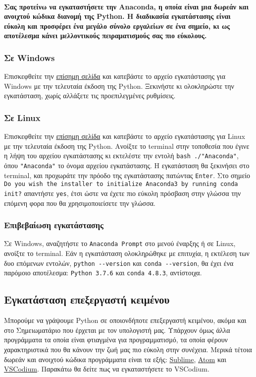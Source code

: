 \documentclass[a4paper,10pt]{report}
\begin{document}
\paragraph{
    Σας προτείνω να εγκαταστήσετε την Anaconda, η οποία είναι μια δωρεάν
    και ανοιχτού κώδικα διανομή της Python. Η διαδικασία εγκατάστασης είναι
    εύκολη και προσφέρει ένα μεγάλο σύνολο εργαλείων σε ένα σημείο, κι ως
    αποτέλεσμα κάνει μελλοντικούς πειραματισμούς σας πιο εύκολους.
}
\subsubsection{Σε Windows}
Επισκεφθείτε την \href{https://tinyurl.com/yc39u67t}{επίσημη σελίδα}
και κατεβάστε το αρχείο εγκατάστασης για Windows με την τελευταία έκδοση της
Python. Ξεκινήστε κι ολοκληρώστε την εγκατάσταση, χωρίς αλλάξετε τις
προεπιλεγμένες ρυθμίσεις.
\subsubsection{Σε Linux}
Επισκεφθείτε την \href{https://tinyurl.com/yc39u67t}{επίσημη σελίδα}
και κατεβάστε το αρχείο εγκατάστασης για Linux με την τελευταία έκδοση της
Python. Ανοίξτε το terminal στην τοποθεσία που έγινε η λήψη του αρχείου
εγκατάστασης κι εκτελέστε την εντολή
\lstinline{bash ./"Anaconda"}, όπου
\lstinline{"Anaconda"} το όνομα αρχείου εγκατάστασης.
Η εγκατάσταση θα ξεκινήσει στο terminal, και προχωράτε την πρόοδο της
εγκατάστασης πατώντας \lstinline{Enter}. Στο σημείο
\lstinline{Do you wish the installer to initialize Anaconda3 by running conda init?}
απαντήστε \lstinline{yes}, έτσι ώστε να έχετε πιο
εύκολη πρόσβαση στην γλώσσα την επόμενη φορα που θα χρησιμοποιείσετε την
γλώσσα.
\subsubsection{Επιβεβαίωση εγκατάστασης}
Σε Windows, αναζητήστε το \lstinline{Anaconda Prompt}
στο μενού έναρξης ή σε Linux, ανοίξτε το terminal.
Εάν η εγκατάσταση ολοκληρώθηκε με επιτυχία, η εκτέλεση των δυο επόμενων
εντολών, \lstinline{python --version} και
\lstinline{conda --version}, θα έχει ένα παρόμοιο
αποτέλεσμα: \lstinline{Python 3.7.6} και
\lstinline{conda 4.8.3}, αντίστοιχα.
\subsection{Εγκατάσταση επεξεργαστή κειμένου}
Μπορούμε να γράψουμε Python σε οποιονδήποτε επεξεργαστή κειμένου, ακόμα και
στο Σημειωματάριο που έρχεται με τον υπολογιστή μας. Υπάρχουν όμως άλλα
προγράμματα τα οποία είναι φτιαγμένα για προγραμματισμό, τα οποία φέρουν
χαρακτηριστικά που θα κάνουν την ζωή μας πιο εύκολη στην συνέχεια. Μερικά
τέτοια δωρεάν και ανοιχτού κώδικα προγράμματα είναι τα εξής:
\href{https://tinyurl.com/hh3vvrn}{Sublime},
\href{https://tinyurl.com/l2uxckn}{Atom} και
\href{https://tinyurl.com/y54gclet}{VSCodium}. Παρακάτω θα δείτε πως να
εγκαταστήσετε το VSCodium.
\end{document}
